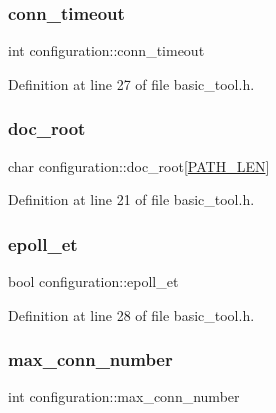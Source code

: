 \subsubsection{\texorpdfstring{conn\+\_\+timeout}{conn\_timeout}}
{\footnotesize\ttfamily int configuration\+::conn\+\_\+timeout}



Definition at line 27 of file basic\+\_\+tool.\+h.

\mbox{\label{structconfiguration_a482e552476305ad16d1d517f4d87e3af}} 
\subsubsection{\texorpdfstring{doc\+\_\+root}{doc\_root}}
{\footnotesize\ttfamily char configuration\+::doc\+\_\+root\mbox{[}\hyperlink{basic__tool_8h_aac8fbc596a0261f72b1c34bec8fc40a6}{P\+A\+T\+H\+\_\+\+L\+EN}\mbox{]}}



Definition at line 21 of file basic\+\_\+tool.\+h.

\mbox{\label{structconfiguration_a95c4d9c8e2e28f0418b2848a050c1e62}} 
\subsubsection{\texorpdfstring{epoll\+\_\+et}{epoll\_et}}
{\footnotesize\ttfamily bool configuration\+::epoll\+\_\+et}



Definition at line 28 of file basic\+\_\+tool.\+h.

\mbox{\label{structconfiguration_ae9218aebfb7459d0bb8f400496d222ee}} 
\subsubsection{\texorpdfstring{max\+\_\+conn\+\_\+number}{max\_conn\_number}}
{\footnotesize\ttfamily int configuration\+::max\+\_\+conn\+\_\+number}



